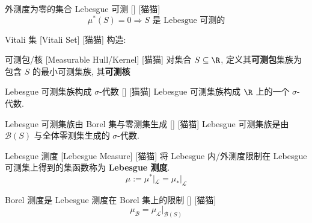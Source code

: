 \documentclass[UTF8]{ctexart}
\begin{document}
            \begin{ppt}
                {外测度为零的集合 Lebesgue 可测}
                []
                [猫猫]
                \[\mu^*(S)=0\Longrightarrow S\text{ 是 Lebesgue 可测的}\]
            \end{ppt}
            
            \begin{cxmp}
                {Vitali 集}
                [Vitali Set]
                [猫猫]
                构造: 
            \end{cxmp}
            
            \begin{dfn}
                {可测包/核}
                [Measurable Hull/Kernel]
                [猫猫]
                对集合 \(S\subseteq\R\), 定义其\textbf{可测包}集族为包含 \(S\) 的最小可测集族, 其\textbf{可测核}
            \end{dfn}
            
            \begin{thm}
                {Lebesgue 可测集族构成 \(\sigma\)-代数}
                []
                [猫猫]
                Lebesgue 可测集族构成 \(\R\) 上的一个 \(\sigma\)-代数. 
            \end{thm}
            
            \begin{crl}
                {Lebesgue 可测集族由 Borel 集与零测集生成}
                []
                [猫猫]
                Lebesgue 可测集族是由 \(\mathcal{B}(S)\) 与全体零测集生成的 \(\sigma\)-代数. 
            \end{crl}
            
            \begin{dfn}
                {Lebesgue 测度}
                [Lebesgue Measure]
                [猫猫]
                将 Lebesgue 内/外测度限制在 Lebesgue 可测集上得到的集函数称为 \textbf{Lebesgue 测度}. 
                \[\mu:=\mu^*|_\mathcal{L}=\mu_*|_\mathcal{L}\]
            \end{dfn}
            
            \begin{ppt}
                {Borel 测度是 Lebesgue 测度在 Borel 集上的限制}
                []
                [猫猫]
                \[\mu_\mathcal{B}=\mu_\mathcal{L}|_{\mathcal{B}(S)}\]
            \end{ppt}
            
\end{document}
